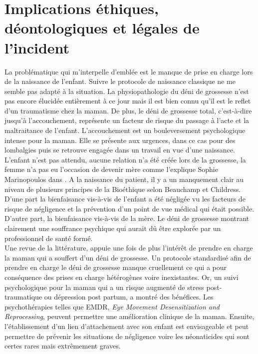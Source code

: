 \section{Implications éthiques, déontologiques et légales de l’incident }

La problématique qui m’interpelle d’emblée est le manque de prise en charge lors de la naissance de l’enfant. Suivre le protocole de naissance classique ne me semble pas adapté à la situation. La physiopathologie du déni de grossesse n’est pas encore élucidée entièrement à ce jour mais il est bien connu qu’il est le reflet d’un traumatisme chez la maman. De plus, le déni de grossesse total, c’est-à-dire jusqu’à l’accouchement, représente un facteur de risque du passage à l’acte et la maltraitance de l’enfant. L’accouchement est un bouleversement psychologique intense pour la maman. Elle se présente aux urgences, dans ce cas pour des lombalgies puis se retrouve engagée dans un travail  en vue d’une naissance. L’enfant n’est pas attendu, aucune relation n’a été créée lors de la grossesse, la femme n’a pas eu l’occasion de devenir mère comme l’explique Sophie Marinopoulos dans \textcite{marinopoulos_deni_2019}. A la naissance du patient, il y a un manquement clair au niveau de plusieurs principes de la Bioéthique selon Beauchamp et Childress. D’une part la bienfaisance vis-à-vis de l’enfant a été négligée vu les facteurs de risque de négligence et la prévention d’un point de vue médical qui était possible. D’autre part, la bienfaisance vis-à-vis de la mère. Le déni de grossesse montrant clairement une souffrance psychique qui aurait dû être explorée par un professionnel de santé formé.\\  

Une revue de la littérature,  \textcite{lagedamon2025accompagnement} appuie une fois de plus l’intérêt de prendre en charge la maman qui a souffert d’un déni de grossesse. Un protocole standardisé afin de prendre en charge le déni de grossesse manque cruellement ce qui a pour conséquence des prises en charge hétérogènes voire inexistantes. Or, un suivi psychologique pour la maman qui a un risque augmenté de stress post-traumatique ou dépression post partum, a montré des bénéfices. Les psychothérapies telles que EMDR, \textit{Eye Movement Desensitization and Reprocessing}, peuvent permettre une amélioration clinique de la maman. Ensuite, l’établissement d’un lien d’attachement avec son enfant est envisageable et peut permettre de prévenir les situations de négligence voire les néonaticides qui sont certes rares mais extrêmement graves.\\

